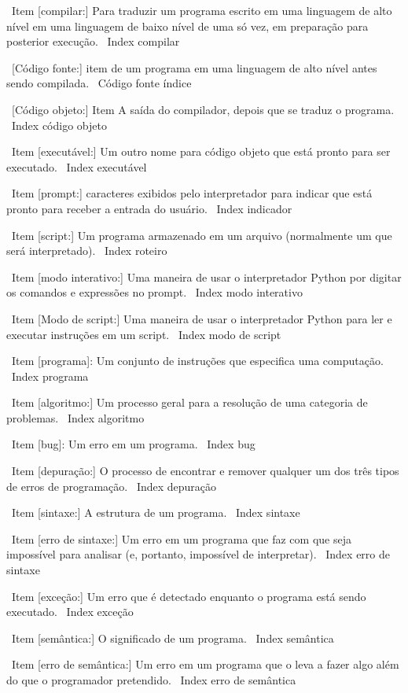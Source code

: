 \documentclass[10pt]{book}
\begin{document}
{\ Item [compilar:] Para traduzir um programa escrito em uma linguagem de alto nível
em uma linguagem de baixo nível de uma só vez, em preparação para posterior
execução.
\ Index {} compilar

\ [Código fonte:] item de um programa em uma linguagem de alto nível antes
sendo compilada.
\ {Código fonte} índice

\ [Código objeto:] Item A saída do compilador, depois que se traduz
o programa.
\ Index {código objeto}

\ Item [executável:] Um outro nome para código objeto que está pronto
para ser executado.
\ Index {executável}

\ Item [prompt:] caracteres exibidos pelo interpretador para indicar
que está pronto para receber a entrada do usuário.
\ Index {indicador}

\ Item [script:] Um programa armazenado em um arquivo (normalmente um que será
interpretado).
\ Index {} roteiro

\ Item [modo interativo:] Uma maneira de usar o interpretador Python por
digitar os comandos e expressões no prompt.
\ Index {modo interativo}

\ Item [Modo de script:] Uma maneira de usar o interpretador Python para ler
e executar instruções em um script.
\ Index {modo de script}

\ Item [programa]: Um conjunto de instruções que especifica uma computação.
\ Index {programa}

\ Item [algoritmo:] Um processo geral para a resolução de uma categoria de
problemas.
\ Index {algoritmo}

\ Item [bug]: Um erro em um programa.
\ Index {bug}

\ Item [depuração:] O processo de encontrar e remover qualquer um dos
três tipos de erros de programação.
\ Index {depuração}

\ Item [sintaxe:] A estrutura de um programa.
\ Index {} sintaxe

\ Item [erro de sintaxe:] Um erro em um programa que faz com que seja impossível
para analisar (e, portanto, impossível de interpretar).
\ Index {erro de sintaxe}

\ Item [exceção:] Um erro que é detectado enquanto o programa está sendo executado.
\ Index {exceção}

\ Item [semântica:] O significado de um programa.
\ Index {} semântica

\ Item [erro de semântica:] Um erro em um programa que o leva a fazer algo
além do que o programador pretendido.
\ Index {erro de semântica}

}
\end{document}
